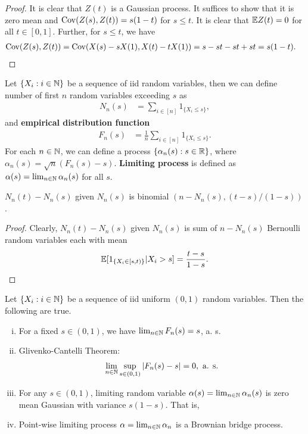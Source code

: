 \documentclass[a4paper,10pt,english]{article}
\begin{document}
\begin{proof} It is clear that $Z(t)$ is a Gaussian process. 
It suffices to show that it is zero mean and $\operatorname{Cov}(Z(s), Z(t)) = s(1-t)$ for $s \leq t$. 
It is clear that $\mathbb{E} Z(t) = 0$ for all $t \in [0,1]$. 
Further, for $s \leq t$, we have 
\begin{align*}
\operatorname{Cov}(Z(s),Z(t)) &= \operatorname{Cov}(X(s) - sX(1), X(t) - tX(1)) = s - st - st +st = s(1 - t).
\end{align*}
\end{proof}
\begin{defn} 
Let $\{X_i: i \in \mathbb{N}\}$ be a sequence of iid random variables, then we can define number of first $n$ random variables exceeding $s$ as 
\begin{align*}
N_n(s) &= \sum_{i \in [n]}1_{\{X_i \leq s \}},
\end{align*}
and \textbf{empirical distribution function}
\begin{align*}
F_n(s) &= \frac{1}{n}\sum_{i \in [n]}1_{\{X_i \leq s \}}.
\end{align*}
For each $n \in \mathbb{N}$, we can define a process $\{\alpha_n(s): s \in \mathbb{R}\}$, where $\alpha_n(s) = \sqrt{n}(F_n(s) - s )$. \textbf{Limiting process} is defined as $\alpha(s) = \lim_{n \in \mathbb{N}}\alpha_n(s)$ for all $s$.
\end{defn}
\begin{lem} $N_n(t) - N_n(s)$ given $N_n(s)$ is binomial $(n - N_n(s), (t-s)/(1-s))$.
\end{lem}
\begin{proof} Clearly, $N_n(t) - N_n(s)$ given $N_n(s)$ is sum of $n-N_n(s)$ Bernoulli random variables each with mean
\begin{align*}
\mathbb{E}[1_{\{X_i \in [s, t)\}}| X_i > s] = \frac{t-s}{1-s}.
\end{align*}
\end{proof}
\begin{prop} Let $\{X_i : i \in \mathbb{N}\}$ be a sequence of iid uniform $(0,1)$ random variables. Then the following are true.
\begin{enumerate}[i)]
\item For a fixed $s \in (0,1)$, we have  $\lim_{n \in \mathbb{N}} F_n(s) = s$, a. s.
\item Glivenko-Cantelli Theorem: 
\begin{align*}
\lim_{n \in \mathbb{N}}\sup_{s \in (0,1)}|F_n(s) - s| = 0,\text{ a. s.}
\end{align*}
\item For any $s \in (0,1)$, limiting random variable $\alpha(s) = \lim_{n \in \mathbb{N}}\alpha_n(s)$ is zero mean Gaussian with variance $s(1-s)$.
That is, \item Point-wise limiting process $\alpha = \lim_{n \in \mathbb{N}}\alpha_n$ is a Brownian bridge process. 
\end{enumerate}
\end{prop}
\end{document}
